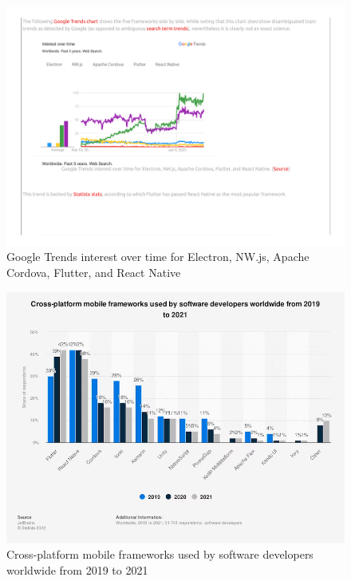 \documentclass[sigconf]{acmart}
\begin{document}
\begin{figure}[H]
    \centering
    \includegraphics[clip, trim=3.5cm 8.2cm 12cm 4.5cm, width=\columnwidth]{Google Trends.pdf}
    \caption{Google Trends interest over time for Electron, NW.js, Apache Cordova, Flutter, and React Native}
    \label{fig:googletrends}
\end{figure}

\begin{figure}[H]
    \centering
    \includegraphics[width=\columnwidth]{statista.png}
    \caption{Cross-platform mobile frameworks used by software developers worldwide from 2019 to 2021}
    \label{fig:statista}
\end{figure}
\end{document}
